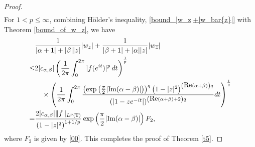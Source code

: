 \documentclass[11pt, reqno]{amsart}
\newtheorem{theorem}{Theorem}
\theoremstyle{definition}
\numberwithin{equation}{section}
\newcommand{\D}{\mbox{$\mathbb{D}$}}
\theoremstyle{remark}
\numberwithin{equation}{section}
\begin{document}
\begin{proof}
\begin{align}
    \end{align}
	For $1<p\leq \infty$, combining
H\"older's inequality, \eqref{bound_|w_z|+|w_bar{z}|} with Theorem \ref{bound_of_w_z}, we have
	\begin{align*}
    \begin{split}
		&\frac{1}{|\alpha+1|+|\beta||z|}|w_z|+\frac{1}{|\beta+1|+|\alpha||z|}|w_{\overline{z}}|\\\leq&2|c_{\alpha,\beta}|\left(\frac{1}{2\pi}\int_{0}^{2\pi}
		|f(e^{it})|^{p}\,dt\right)^{\frac{1}{p}} \\&\quad \times\left(\frac{1}{2\pi}\int_{0}^{2\pi}\dfrac{\left(\exp\left(\frac{\pi}{2}|\mbox{\rm Im}(\alpha- \beta)|\right)\right)^q\left(1-|z|^2\right)^{\left(\mbox{\rm Re}(\alpha+\beta)\right) q}}{(|1-ze^{-it}|)^{\left(\mbox{\rm Re}(\alpha+\beta)+2\right)q}} dt\right)^{\frac{1}{q}}\\=&\dfrac{2|c_{\alpha,\beta}|\|f\|_{L^p(\mathbb{T})} }{\left(1-|z|^2\right)^{1+1/p}}\exp\left(\frac{\pi}{2}|\mbox{\rm Im}(\alpha- \beta)|\right)F_2,   
    \end{split}
	\end{align*}
where $F_2$ is given by \eqref{00}. This completes the proof of Theorem \ref{t5}.
\end{proof}



\end{document}
